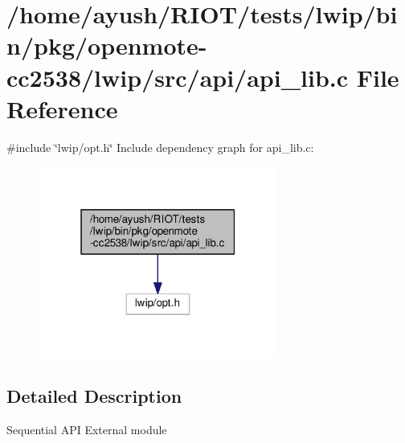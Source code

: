 \hypertarget{openmote-cc2538_2lwip_2src_2api_2api__lib_8c}{}\section{/home/ayush/\+R\+I\+O\+T/tests/lwip/bin/pkg/openmote-\/cc2538/lwip/src/api/api\+\_\+lib.c File Reference}
\label{openmote-cc2538_2lwip_2src_2api_2api__lib_8c}
{\ttfamily \#include \char`\"{}lwip/opt.\+h\char`\"{}}\newline
Include dependency graph for api\+\_\+lib.\+c\+:
\nopagebreak
\begin{figure}[H]
\begin{center}
\leavevmode
\includegraphics[width=223pt]{openmote-cc2538_2lwip_2src_2api_2api__lib_8c__incl}
\end{center}
\end{figure}


\subsection{Detailed Description}
Sequential A\+PI External module 